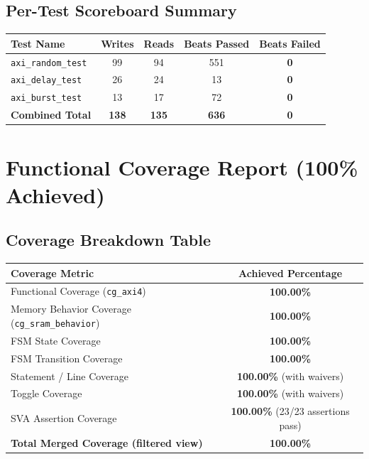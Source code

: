 \documentclass[10pt,a4paper]{article}
\begin{document}
\subsection{Per-Test Scoreboard Summary}
\begin{center}
\begin{tabular}{|l|c|c|c|c|}
\hline
\textbf{Test Name} & \textbf{Writes} & \textbf{Reads} & \textbf{Beats Passed} & \textbf{Beats Failed} \\
\hline
\texttt{axi\_random\_test} & 99 & 94 & 551 & \textcolor{passgreen}{\textbf{0}} \\
\texttt{axi\_delay\_test} & 26 & 24 & 13 & \textcolor{passgreen}{\textbf{0}} \\
\texttt{axi\_burst\_test} & 13 & 17 & 72 & \textcolor{passgreen}{\textbf{0}} \\
\hline
\textbf{Combined Total} & \textbf{138} & \textbf{135} & \textbf{636} & \textcolor{passgreen}{\textbf{0}} \\
\hline
\end{tabular}
\end{center}

\section{Functional Coverage Report (100\% Achieved)}

\subsection{Coverage Breakdown Table}
\begin{center}
\begin{tabular}{|l|c|}
\hline
\textbf{Coverage Metric} & \textbf{Achieved Percentage} \\
\hline
Functional Coverage (\texttt{cg\_axi4}) & \textcolor{passgreen}{\textbf{100.00\%}} \\
Memory Behavior Coverage (\texttt{cg\_sram\_behavior}) & \textcolor{passgreen}{\textbf{100.00\%}} \\
FSM State Coverage & \textcolor{passgreen}{\textbf{100.00\%}} \\
FSM Transition Coverage & \textcolor{passgreen}{\textbf{100.00\%}} \\
Statement / Line Coverage & \textcolor{passgreen}{\textbf{100.00\%}} (with waivers) \\
Toggle Coverage & \textcolor{passgreen}{\textbf{100.00\%}} (with waivers) \\
SVA Assertion Coverage & \textcolor{passgreen}{\textbf{100.00\%}} (23/23 assertions pass) \\
\hline
\textbf{Total Merged Coverage (filtered view)} & \textcolor{passgreen}{\textbf{100.00\%}} \\
\hline
\end{tabular}
\end{center}
\end{document}
